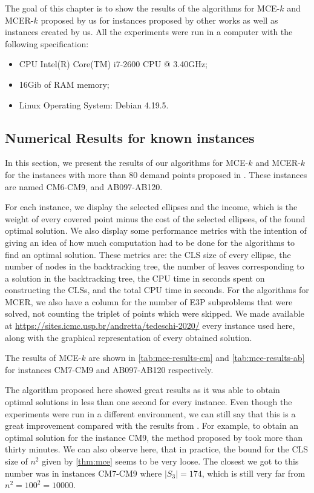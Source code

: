 The goal of this chapter is to show the results of the algorithms for MCE-$k$ and MCER-$k$ proposed by us for instances proposed by other works as well as instances created by us. All the experiments were run in a computer with the following specification:
\begin{itemize}
	\item CPU Intel(R) Core(TM) i7-2600 CPU @ 3.40GHz;
	\item 16Gib of RAM memory;
	\item Linux Operating System: Debian 4.19.5.
\end{itemize}

\subsection{Numerical Results for known instances}

In this section, we present the results of our algorithms for MCE-$k$ and MCER-$k$ 
for the instances with more than $80$ demand points proposed in \cite{canbolat, andreta}. These instances are named CM6-CM9, and AB097-AB120.

For each instance, we display the selected ellipses and the income, which is the weight of every covered point minus the cost of the selected ellipses, of the found optimal solution.
We also display some performance metrics with the intention of giving an idea of how much computation had to be done for the algorithms to find an optimal solution. These metrics are: 
the CLS size of every ellipse, the number of nodes in the backtracking tree, the number of leaves corresponding to a solution in the backtracking tree, the CPU time in seconds spent on constructing the CLSs, and the total CPU time in seconds.
For the algorithms for MCER, we also have a column for the number of E3P subproblems that were solved, not counting the triplet of points which were skipped.
We made available at \url{https://sites.icmc.usp.br/andretta/tedeschi-2020/} every instance used here, along with the graphical representation of every obtained solution.

The results of MCE-$k$ are shown in \autoref{tab:mce-results-cm} and  \autoref{tab:mce-results-ab} for instances CM7-CM9 and AB097-AB120 respectively.


The algorithm proposed here showed great results as it was able to obtain optimal solutions in less than one second for every instance.
Even though the experiments were run in a different environment, we can still say that this is a great improvement compared with the results from \cite{andreta}. For example, to obtain an optimal solution for the instance CM9, the method proposed by \cite{andreta} took more than thirty minutes.
We can also observe here, that in practice, the bound for the CLS size of $n^2$ given by \autoref{thm:mce} seems to be very loose. The closest we got to this number was in instances CM7-CM9 where $|S_3|=174$, which is still very far from $n^2=100^2=\num{10000}$.


